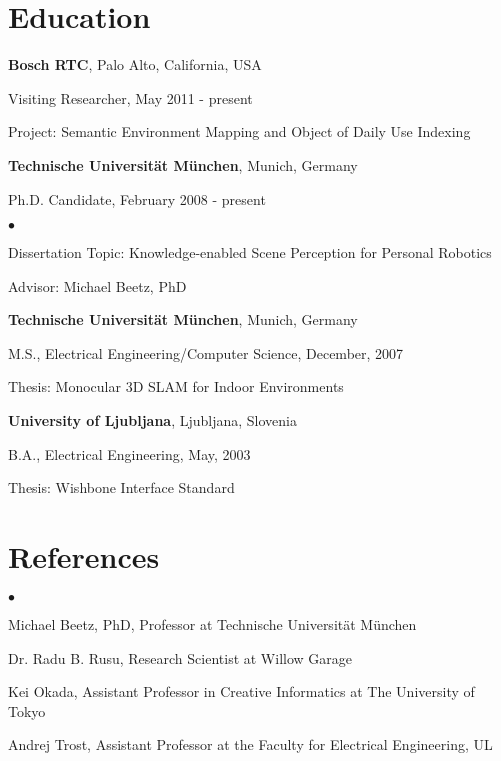 \documentclass[margin,line]{res}
\newenvironment{list1}{
  \begin{list}{\ding{113}}{%
      \setlength{\itemsep}{0in}
      \setlength{\parsep}{0in} \setlength{\parskip}{0in}
      \setlength{\topsep}{0in} \setlength{\partopsep}{0in} 
      \setlength{\leftmargin}{0.17in}}}{\end{list}}
\newenvironment{list2}{
  \begin{list}{$\bullet$}{%
      \setlength{\itemsep}{0in}
      \setlength{\parsep}{0in} \setlength{\parskip}{0in}
      \setlength{\topsep}{0in} \setlength{\partopsep}{0in} 
      \setlength{\leftmargin}{0.2in}}}{\end{list}}
\begin{document}
\begin{resume}
\section{\sc Education}
{\bf Bosch RTC}, Palo Alto, California, USA\\
\vspace*{-.1in}
\begin{list1}
\item[] Visiting Researcher,  May 2011 - present
\item[] Project: Semantic Environment Mapping and Object of Daily Use Indexing
\end{list1}
{\bf Technische Universit\"at M\"unchen}, Munich, Germany\\
\vspace*{-.1in}
\begin{list1}
\item[] Ph.D. Candidate, February 2008 - present
\begin{list2}
\vspace*{.05in}
\item Dissertation Topic: Knowledge-enabled Scene Perception for Personal Robotics
\item Advisor:  Michael Beetz, PhD
\end{list2}
\vspace*{.05in}
\end{list1}
{\bf Technische Universit\"at M\"unchen}, Munich, Germany\\
\vspace*{-.1in}
\begin{list1}
\item[] M.S., Electrical Engineering/Computer Science,  December, 2007
\item[] Thesis: Monocular 3D SLAM for Indoor Environments 
\end{list1}
{\bf University of Ljubljana}, Ljubljana, Slovenia\\
\vspace*{-.1in}
\begin{list1}
\item[] B.A., Electrical Engineering, May, 2003
\item[] Thesis: Wishbone Interface Standard
\end{list1}
\section{\sc References}
\begin{list2}
\item Michael Beetz, PhD, Professor at Technische Universit\"at M\"unchen
\item Dr. Radu B. Rusu, Research Scientist at Willow Garage
\item Kei Okada, Assistant Professor in Creative Informatics at The University of Tokyo
\item Andrej Trost, Assistant Professor at the Faculty for Electrical Engineering, UL
\end{list2}

\end{resume}
\end{document}

